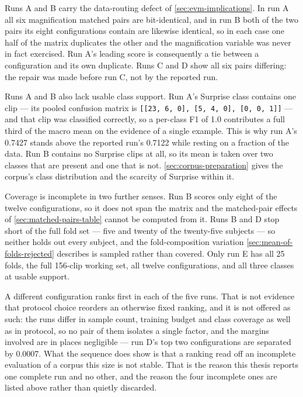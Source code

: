 Runs A and B carry the data-routing defect of \autoref{sec:evm-implications}. In run A all six magnification matched pairs are bit-identical, and in run B both of the two pairs its eight configurations contain are likewise identical, so in each case one half of the matrix duplicates the other and the magnification variable was never in fact exercised. Run A's leading score is consequently a tie between a configuration and its own duplicate. Runs C and D show all six pairs differing: the repair was made before run C, not by the reported run.

Runs A and B also lack usable class support. Run A's Surprise class contains one clip --- its pooled confusion matrix is \verb|[[23, 6, 0], [5, 4, 0], [0, 0, 1]]| --- and that clip was classified correctly, so a per-class F1 of 1.0 contributes a full third of the macro mean on the evidence of a single example. This is why run A's 0.7427 stands above the reported run's 0.7122 while resting on a fraction of the data. Run B contains no Surprise clips at all, so its mean is taken over two classes that are present and one that is not. \autoref{sec:corpus-preparation} gives the corpus's class distribution and the scarcity of Surprise within it.

Coverage is incomplete in two further senses. Run B scores only eight of the twelve configurations, so it does not span the matrix and the matched-pair effects of \autoref{sec:matched-pairs-table} cannot be computed from it. Runs B and D stop short of the full fold set --- five and twenty of the twenty-five subjects --- so neither holds out every subject, and the fold-composition variation \autoref{sec:mean-of-folds-rejected} describes is sampled rather than covered. Only run E has all 25 folds, the full 156-clip working set, all twelve configurations, and all three classes at usable support.

A different configuration ranks first in each of the five runs. That is not evidence that protocol choice reorders an otherwise fixed ranking, and it is not offered as such: the runs differ in sample count, training budget and class coverage as well as in protocol, so no pair of them isolates a single factor, and the margins involved are in places negligible --- run D's top two configurations are separated by 0.0007. What the sequence does show is that a ranking read off an incomplete evaluation of a corpus this size is not stable. That is the reason this thesis reports one complete run and no other, and the reason the four incomplete ones are listed above rather than quietly discarded.


